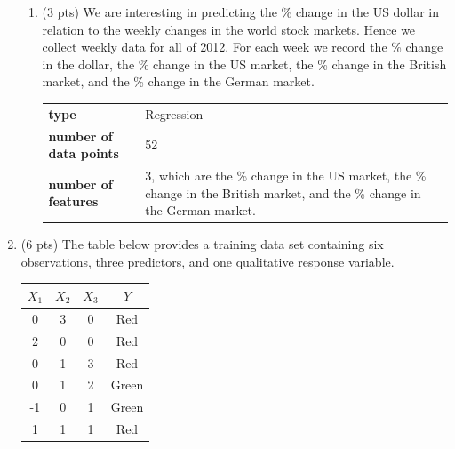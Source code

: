 \documentclass[a4paper]{article}
\theoremstyle{definition}
\newenvironment{soln}{
    \leavevmode\color{blue}\ignorespaces
}{}
\begin{document}
\begin{enumerate}
\begin{enumerate}
		      \item (3 pts) We are interesting in predicting the \% change in the US dollar in relation to the weekly changes in the world stock markets. Hence we collect weekly data for all of 2012. For each week we record the \% change in the dollar, the \% change in the US market, the \% change in the British market, and the \% change in the German market.

		            \begin{soln}
			            \begin{tabular}{l p{}}
				            \textbf{type}                  & Regression                                                                                                                \\
				            \textbf{number of data points} & 52                                                                                                                        \\
				            \textbf{number of features}    & 3, which are the \% change in the US market, the \% change in the British market, and the \% change in the German market.
			            \end{tabular}
		            \end{soln}

	      \end{enumerate}

	      \pagebreak
	\item (6 pts) The table below provides a training data set containing six observations, three predictors, and one qualitative response variable.

	      \begin{center}
		      \begin{tabular}{ c  c  c  c}
			      \hline
			      $X_{1}$ & $X_{2}$ & $X_{3}$ & $Y$   \\ \hline
			      0       & 3       & 0       & Red   \\
			      2       & 0       & 0       & Red   \\
			      0       & 1       & 3       & Red   \\
			      0       & 1       & 2       & Green \\
			      -1      & 0       & 1       & Green \\
			      1       & 1       & 1       & Red   \\
			      \hline
		      \end{tabular}
	      \end{center}


\end{enumerate}
\end{document}
